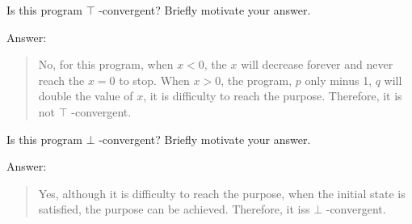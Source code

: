 \documentclass{article}
\begin{document}
\begin{Question} 
\begin{Subquestion}
\begin{answer}
\begin{quote}
    \end{quote}
\end{answer}
\end{Subquestion}

\clearpage
\begin{Subquestion}
    Is this program $\top$ -convergent? Briefly motivate your answer.
    
\begin{answer}
    Answer:
    \begin{quote}
        No, for this program, when $x < 0$, the $x$ will decrease forever and never reach the $x=0$ to stop. When $x > 0$, the program, $p$ only minus 1, $q$ will double the value of $x$, it is difficulty to reach the purpose. Therefore, it is not $\top$ -convergent.\\
    \end{quote}
\end{answer}
\end{Subquestion}

\begin{Subquestion}
    Is this program $\bot$ -convergent? Briefly motivate your answer.

\begin{answer}
    Answer:
    \begin{quote}
        Yes, although it is difficulty to reach the purpose, when the initial state is satisfied, the purpose can be achieved. Therefore, it iss $\bot$ -convergent.\\
    \end{quote}
\end{answer}
\end{Subquestion}


\end{Question}
\end{document}
